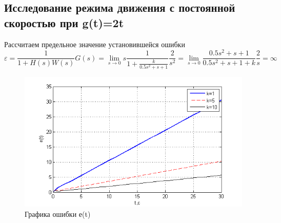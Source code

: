 \documentclass[a4paper, 10pt]{article}
\begin{document}
\subsection{Исследование режима движения с постоянной скоростью при g(t)=2t}\hfill\par
Рассчитаем предельное значение установившейся ошибки\\
\begin{equation}
\varepsilon  = \frac{1}{{1 + H\left( s \right)W\left( s \right)}}G\left( s \right) = \mathop {\lim }\limits_{s \to 0} s\frac{1}{{1 + \frac{k}{{0.5{s^2} + s + 1}}}}\frac{2}{{{s^2}}} = \mathop {\lim }\limits_{s \to 0} \frac{{0.5{s^2} + s + 1}}{{0.5{s^2} + s + 1 + k}}\frac{2}{s} = \infty 
\end{equation}
\begin{center}

	\begin{figure}[h]
		\centering
			\includegraphics[width=0.7\linewidth]{33}
		\caption{Графика ошибки е(t)}
		\label{fig:33}
	\end{figure}
\end{center}
\end{document}
